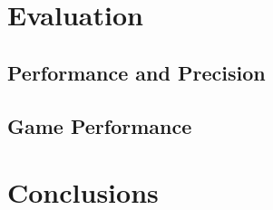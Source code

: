 \documentclass[]{report}
\begin{document}
\chapter{Evaluation}

\section{Performance and Precision}

\section{Game Performance}

\chapter{Conclusions}

\printbibliography
\end{document}
